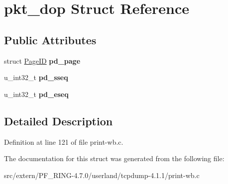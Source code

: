 \hypertarget{structpkt__dop}{
\section{pkt\_\-dop Struct Reference}
\label{structpkt__dop}
}
\subsection*{Public Attributes}
\begin{DoxyCompactItemize}
\item 
\hypertarget{structpkt__dop_a16f1010d7c957fde9eda556344efaed9}{
struct \hyperlink{struct_page_i_d}{PageID} {\bfseries pd\_\-page}}
\label{structpkt__dop_a16f1010d7c957fde9eda556344efaed9}

\item 
\hypertarget{structpkt__dop_a94fb4d26462625f98ef571df03b49fe0}{
u\_\-int32\_\-t {\bfseries pd\_\-sseq}}
\label{structpkt__dop_a94fb4d26462625f98ef571df03b49fe0}

\item 
\hypertarget{structpkt__dop_ab1389082626db3dfec3767a2f8eb5a22}{
u\_\-int32\_\-t {\bfseries pd\_\-eseq}}
\label{structpkt__dop_ab1389082626db3dfec3767a2f8eb5a22}

\end{DoxyCompactItemize}


\subsection{Detailed Description}


Definition at line 121 of file print-\/wb.c.



The documentation for this struct was generated from the following file:\begin{DoxyCompactItemize}
\item 
src/extern/PF\_\-RING-\/4.7.0/userland/tcpdump-\/4.1.1/print-\/wb.c\end{DoxyCompactItemize}
